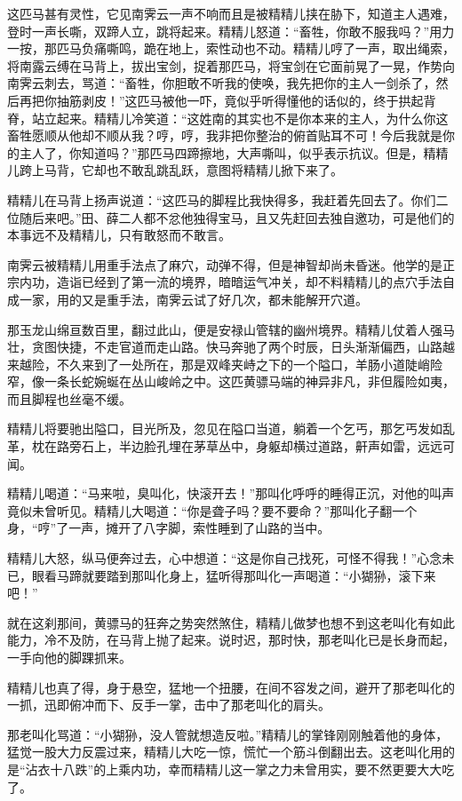 \documentclass[12pt,oneside]{book}
\begin{document}
这匹马甚有灵性，它见南霁云一声不响而且是被精精儿挟在胁下，知道主人遇难，登时一声长嘶，双蹄人立，跳将起来。精精儿怒道：``畜牲，你敢不服我吗？''用力一按，那匹马负痛嘶鸣，跪在地上，索性动也不动。精精儿哼了一声，取出绳索，将南露云缚在马背上，拔出宝剑，捉着那匹马，将宝剑在它面前晃了一晃，作势向南霁云刺去，骂道：``畜牲，你胆敢不听我的使唤，我先把你的主人一剑杀了，然后再把你抽筋剥皮！''这匹马被他一吓，竟似乎听得懂他的话似的，终于拱起背脊，站立起来。精精儿冷笑道：``这姓南的其实也不是你本来的主人，为什么你这畜牲愿顺从他却不顺从我？哼，哼，我非把你整治的俯首贴耳不可！今后我就是你的主人了，你知道吗？''那匹马四蹄擦地，大声嘶叫，似乎表示抗议。但是，精精儿跨上马背，它却也不敢乱跳乱跃，意图将精精儿掀下来了。

精精儿在马背上扬声说道：``这匹马的脚程比我快得多，我赶着先回去了。你们二位随后来吧。''田、薛二人都不忿他独得宝马，且又先赶回去独自邀功，可是他们的本事远不及精精儿，只有敢怒而不敢言。

南霁云被精精儿用重手法点了麻穴，动弹不得，但是神智却尚未昏迷。他学的是正宗内功，造诣已经到了第一流的境界，暗暗运气冲关，却不料精精儿的点穴手法自成一家，用的又是重手法，南霁云试了好几次，都未能解开穴道。

那玉龙山绵亘数百里，翻过此山，便是安禄山管辖的幽州境界。精精儿仗着人强马壮，贪图快捷，不走官道而走山路。快马奔驰了两个时辰，日头渐渐偏西，山路越来越险，不久来到了一处所在，那是双峰夹峙之下的一个隘口，羊肠小道陡峭险窄，像一条长蛇婉蜒在丛山峻岭之中。这匹黄骠马端的神异非凡，非但履险如夷，而且脚程也丝毫不缓。

精精儿将要驰出隘口，目光所及，忽见在隘口当道，躺着一个乞丐，那乞丐发如乱革，枕在路旁石上，半边脸孔埋在茅草丛中，身躯却横过道路，鼾声如雷，远远可闻。

精精儿喝道：``马来啦，臭叫化，快滚开去！''那叫化呼呼的睡得正沉，对他的叫声竟似未曾听见。精精儿大喝道：``你是聋子吗？要不要命？''那叫化子翻一个身，``哼''了一声，摊开了八字脚，索性睡到了山路的当中。

精精儿大怒，纵马便奔过去，心中想道：``这是你自己找死，可怪不得我！''心念未已，眼看马蹄就要踏到那叫化身上，猛听得那叫化一声喝道：``小猢狲，滚下来吧！''

就在这刹那间，黄骠马的狂奔之势突然煞住，精精儿做梦也想不到这老叫化有如此能力，冷不及防，在马背上抛了起来。说时迟，那时快，那老叫化已是长身而起，一手向他的脚踝抓来。

精精儿也真了得，身于悬空，猛地一个扭腰，在间不容发之间，避开了那老叫化的一抓，迅即俯冲而下、反手一掌，击中了那老叫化的肩头。

那老叫化骂道：``小猢狲，没人管就想造反啦。''精精儿的掌锋刚刚触着他的身体，猛觉一股大力反震过来，精精儿大吃一惊，慌忙一个筋斗倒翻出去。这老叫化用的是``沾衣十八跌''的上乘内功，幸而精精儿这一掌之力未曾用实，要不然更要大大吃了。
\end{document}
